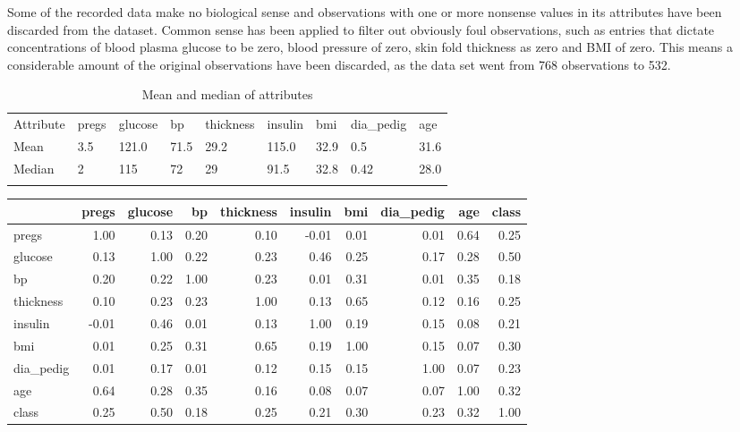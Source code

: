 Some of the recorded data make no biological sense and observations with one or
more nonsense values in its attributes have been discarded from the dataset.
Common sense has been applied to filter out obviously foul observations, such
as entries that dictate concentrations of blood plasma glucose to be zero, blood
pressure of zero, skin fold thickness as zero and BMI of zero. This means a
considerable amount of the original observations have been discarded, as the
data set went from 768 observations to 532.
\bigskip

\begin{table}[]
\centering
\caption{Mean and median of attributes}
\label{my-label}
\begin{tabular}{lllllllll}
\cline{1-1}
\multicolumn{1}{|l|}{Attribute} & pregs & glucose & bp   & thickness & insulin & bmi  & dia\_pedig & age  \\ \cline{1-1}
\multicolumn{1}{|l|}{Mean}      & 3.5   & 121.0   & 71.5 & 29.2      & 115.0   & 32.9 & 0.5        & 31.6 \\ \cline{1-1}
\multicolumn{1}{|l|}{Median}    & 2     & 115     & 72   & 29        & 91.5    & 32.8 & 0.42       & 28.0 \\ \cline{1-1}
                                                       &       &         &      &           &         &      &            &      \\ \hline
\end{tabular}
\end{table}

\begin{tabular}{lrrrrrrrrr}
\toprule
\caption{Correalation matrix}
{} &  pregs &  glucose &    bp &  thickness &  insulin &   bmi &  dia\_pedig &   age &  class \\
\midrule
pregs     &   1.00 &     0.13 &  0.20 &       0.10 &    -0.01 &  0.01 &       0.01 &  0.64 &   0.25 \\
glucose   &   0.13 &     1.00 &  0.22 &       0.23 &     0.46 &  0.25 &       0.17 &  0.28 &   0.50 \\
bp        &   0.20 &     0.22 &  1.00 &       0.23 &     0.01 &  0.31 &       0.01 &  0.35 &   0.18 \\
thickness &   0.10 &     0.23 &  0.23 &       1.00 &     0.13 &  0.65 &       0.12 &  0.16 &   0.25 \\
insulin   &  -0.01 &     0.46 &  0.01 &       0.13 &     1.00 &  0.19 &       0.15 &  0.08 &   0.21 \\
bmi       &   0.01 &     0.25 &  0.31 &       0.65 &     0.19 &  1.00 &       0.15 &  0.07 &   0.30 \\
dia\_pedig &   0.01 &     0.17 &  0.01 &       0.12 &     0.15 &  0.15 &       1.00 &  0.07 &   0.23 \\
age       &   0.64 &     0.28 &  0.35 &       0.16 &     0.08 &  0.07 &       0.07 &  1.00 &   0.32 \\
class     &   0.25 &     0.50 &  0.18 &       0.25 &     0.21 &  0.30 &       0.23 &  0.32 &   1.00 \\
\bottomrule
\end{tabular}
